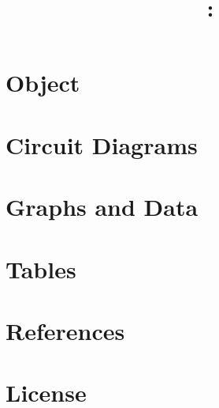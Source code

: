 \documentclass{article}
\title{\courseName\ \labNum: \\ \docTitle}
\author{\docAuthor}
\date{}
\begin{document}


\thispagestyle{empty}
\newpage
\mbox{}

\maketitle
\setcounter{page}{1} %
\tableofcontents %
\newpage
\listoffigures

\newpage %
\section{Object}


\section{Circuit Diagrams}


\section{Graphs and Data}


\newpage
\appendix
\section{Tables}

\newpage
\section{References}

\section{License}

\end{document}
